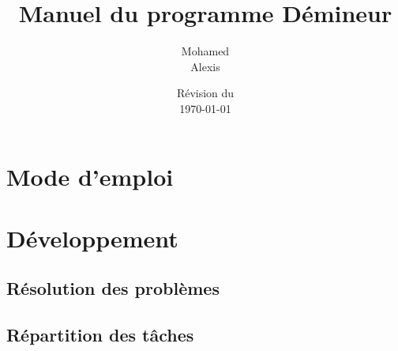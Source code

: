 \documentclass[a4paper, 12pt, oneside]{article}
\title{Manuel du programme Démineur}
\author{Mohamed \bsc{Lakhal}\\Alexis \bsc{Cabodi}}
\date{Révision du\\\today}
\begin{document}
\maketitle
\newpage
\tableofcontents
\newpage

\section{Mode d'emploi}

\newpage
\section{Développement}
\subsection{Résolution des problèmes}

\subsection{Répartition des tâches}
\end{document}
